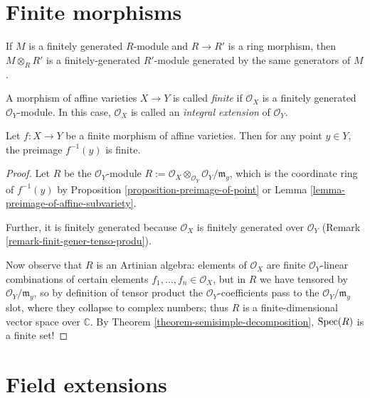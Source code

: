 \section{Finite morphisms}
\label{section-finite-morphisms}

\begin{remark}
\label{remark-finit-gener-tenso-produ}
If $M$ is a finitely generated
$R$-module and $R \to R'$ is a ring
morphism, then $M\otimes_R R'$ is a
finitely-generated $R'$-module
generated by the same generators of
$M$.
\end{remark}

\begin{definition}
\label{definition-finite-morphism}
A morphism of affine
varieties $X \to Y$
is called {\it finite} if
$\mathcal{O}_X$ is a finitely
generated $\mathcal{O}_Y$-module. In
this case, $\mathcal{O}_X$ is called
an {\it integral extension} of
$\mathcal{O}_Y$.
\end{definition}

\begin{theorem}
\label{theorem-finit-map-has-finit-preim}
Let $f:X \to Y$ be a finite morphism of
affine varieties.
Then for any point $y \in Y$,
the preimage $f^{-1}(y)$ is finite.
\end{theorem}

\begin{proof}
Let $R$ be the $\mathcal{O}_Y$-module
$R:= \mathcal{O}_X
\otimes_{\mathcal{O}_Y}\mathcal{O}_Y/
\mathfrak{m}_y$,
which
is the coordinate ring of $f^{-1}(y)$
by Proposition
\ref{proposition-preimage-of-point}
or Lemma
\ref{lemma-preimage-of-affine-subvariety}.

Further, it is finitely generated
because $\mathcal{O}_X$ is finitely generated
over $\mathcal{O}_Y$
(Remark
\ref{remark-finit-gener-tenso-produ}).

Now observe that
$R$ is an Artinian algebra:
elements of $\mathcal{O}_X$
are finite $\mathcal{O}_Y$-linear
combinations of certain elements
$f_1,…,f_n \in \mathcal{O}_X$,
but in $R$ we have tensored by
$\mathcal{O}_Y/\mathfrak{m}_y$,
so by definition of tensor product
the $\mathcal{O}_Y$-coefficients
pass to the $\mathcal{O}_Y/\mathfrak{m}_y$
slot, where they collapse to
complex numbers; thus $R$
is a finite-dimensional vector
space over $\mathbb{C}$.
By Theorem
\ref{theorem-semisimple-decomposition},
$\mathop{\mathrm{Spec}}(R)$ is a finite set!
\end{proof}

\section{Field extensions}
\label{section-field-extensions}

